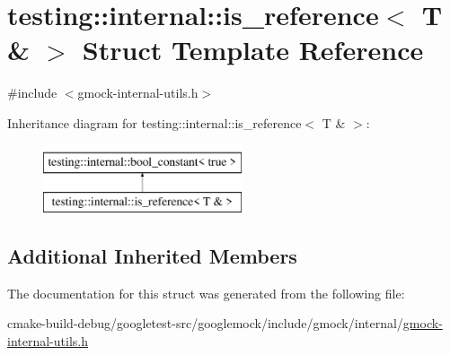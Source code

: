 \hypertarget{structtesting_1_1internal_1_1is__reference_3_01T_01_6_01_4}{}\section{testing\+::internal\+::is\+\_\+reference$<$ T \& $>$ Struct Template Reference}
\label{structtesting_1_1internal_1_1is__reference_3_01T_01_6_01_4}


{\ttfamily \#include $<$gmock-\/internal-\/utils.\+h$>$}

Inheritance diagram for testing\+::internal\+::is\+\_\+reference$<$ T \& $>$\+:\begin{figure}[H]
\begin{center}
\leavevmode
\includegraphics[height=2.000000cm]{structtesting_1_1internal_1_1is__reference_3_01T_01_6_01_4}
\end{center}
\end{figure}
\subsection*{Additional Inherited Members}


The documentation for this struct was generated from the following file\+:\begin{DoxyCompactItemize}
\item 
cmake-\/build-\/debug/googletest-\/src/googlemock/include/gmock/internal/\mbox{\hyperlink{gmock-internal-utils_8h}{gmock-\/internal-\/utils.\+h}}\end{DoxyCompactItemize}
